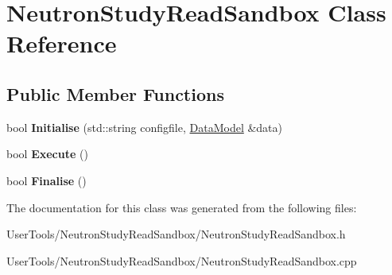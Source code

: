 \hypertarget{classNeutronStudyReadSandbox}{
\section{NeutronStudyReadSandbox Class Reference}
\label{classNeutronStudyReadSandbox}
}
\subsection*{Public Member Functions}
\begin{DoxyCompactItemize}
\item 
\hypertarget{classNeutronStudyReadSandbox_a9e73e205358244c86e066bb28266066f}{
bool {\bfseries Initialise} (std::string configfile, \hyperlink{classDataModel}{DataModel} \&data)}
\label{classNeutronStudyReadSandbox_a9e73e205358244c86e066bb28266066f}

\item 
\hypertarget{classNeutronStudyReadSandbox_a580157d5a29b14c99e698f0919b65049}{
bool {\bfseries Execute} ()}
\label{classNeutronStudyReadSandbox_a580157d5a29b14c99e698f0919b65049}

\item 
\hypertarget{classNeutronStudyReadSandbox_af76eafb91eaf9270a9423e15026d8e20}{
bool {\bfseries Finalise} ()}
\label{classNeutronStudyReadSandbox_af76eafb91eaf9270a9423e15026d8e20}

\end{DoxyCompactItemize}


The documentation for this class was generated from the following files:\begin{DoxyCompactItemize}
\item 
UserTools/NeutronStudyReadSandbox/NeutronStudyReadSandbox.h\item 
UserTools/NeutronStudyReadSandbox/NeutronStudyReadSandbox.cpp\end{DoxyCompactItemize}
